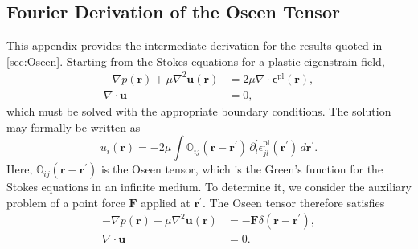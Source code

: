 \newpage
\begin{subappendices}
\section{Fourier Derivation of the Oseen Tensor}
\label{app:OseenDerivation}

This appendix provides the intermediate derivation for the results quoted in \cref{sec:Oseen}. Starting from the Stokes equations for a plastic eigenstrain field,
\begin{subequations}
\label{eq:AppStokes}
\begin{align}
- \nabla p(\bm{r}) + \mu \nabla^2 \bm{u}(\bm{r}) &= 2\mu \nabla \cdot \bm{\epsilon}^{\mathrm{pl}}(\bm{r}), \\
\nabla \cdot \bm{u} &= 0,
\end{align}
\end{subequations}
which must be solved with the appropriate boundary conditions. The solution may formally be written as
\begin{equation}
    u_i(\bm{r}) = -2\mu \int \mathbb{O}_{ij}(\bm{r}-\bm{r}^\prime)\,\partial_l^\prime \epsilon_{jl}^{\mathrm{pl}}(\bm{r}^\prime)\, d\bm{r}^\prime.
\end{equation}
Here, $\mathbb{O}_{ij}(\bm{r}-\bm{r}^\prime)$ is the Oseen tensor, which is the Green's function for the Stokes equations in an infinite medium. To determine it, we consider the auxiliary problem of a point force $\bm{F}$ applied at $\bm{r}^\prime$. The Oseen tensor therefore satisfies
\begin{subequations}
\label{eq:AppStokesPointForce}
\begin{align}
- \nabla p(\bm{r}) + \mu \nabla^2 \bm{u}(\bm{r}) &= -\bm{F} \delta(\bm{r} - \bm{r}^\prime), \label{eq:AppStokesPointForce1} \\
\nabla \cdot \bm{u} &= 0. \label{eq:AppStokesPointForce2}
\end{align}
\end{subequations}


\end{subappendices}
